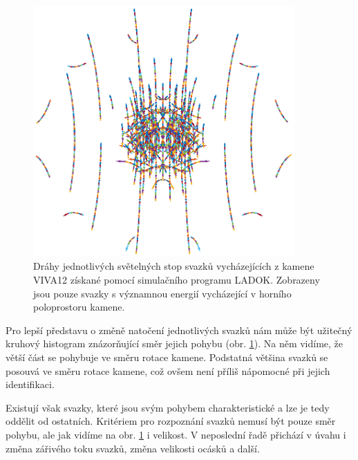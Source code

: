 \begin{figure}[h!]
\begin{center}
\includegraphics[width = 10cm]{figures/viva12_bigflux.eps}
\end{center}
\caption{Dráhy jednotlivých světelných stop svazků vycházejících z kamene VIVA12 získané pomocí simulačního programu  LADOK. Zobrazeny jsou pouze svazky s významnou energií vycházející v horního poloprostoru kamene. }

\label{fig:relativni pohyb graf}
\end{figure}

\newpage
Pro lepší představu o změně natočení jednotlivých svazků nám může být užitečný kruhový histogram znázorňující směr jejich pohybu (obr. \ref{fig:relativni pohyb graf}). Na něm vidíme, že větší část se pohybuje ve směru rotace kamene. Podstatná většina svazků se posouvá ve směru rotace kamene, což ovšem není příliš nápomocné při jejich identifikaci.

Existují však svazky, které jsou svým pohybem charakteristické a lze je tedy oddělit od ostatních. Kritériem pro rozpoznání svazků nemusí být pouze směr pohybu, ale jak vidíme na obr. \ref{fig:relativni pohyb graf} i velikost. V neposlední řadě přichází v úvahu i změna zářivého toku svazků, změna velikosti ocásků a další. 

